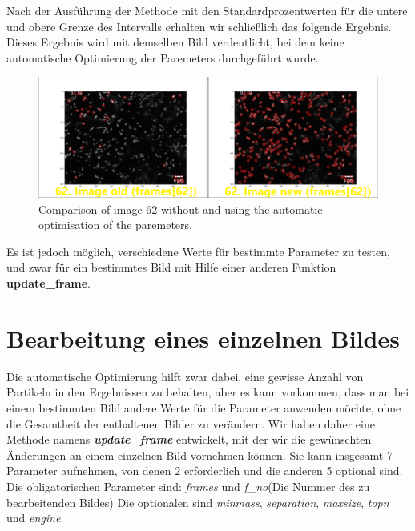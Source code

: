 Nach der Ausführung der Methode mit den Standardprozentwerten für die untere und obere Grenze des Intervalls erhalten wir schließlich das folgende Ergebnis. Dieses Ergebnis wird mit demselben Bild verdeutlicht, bei dem keine automatische Optimierung der Paremeters durchgeführt wurde.

\begin{figure}[H]
    \centering
    \includegraphics[scale=0.35]{Grafiken/trackpyBilder/comparison_62alt_Vs_62new.png}
    \caption{Comparison of image 62 without and using the automatic optimisation of the paremeters.}
\end{figure}
Es ist jedoch möglich, verschiedene Werte für bestimmte Parameter zu testen, und zwar für ein bestimmtes Bild mit Hilfe einer anderen Funktion \textbf{update\_frame}.

\section{Bearbeitung eines einzelnen Bildes}
Die automatische Optimierung hilft zwar dabei, eine gewisse Anzahl von Partikeln in den Ergebnissen zu behalten, aber es kann vorkommen, dass man bei einem bestimmten Bild andere Werte für die Parameter anwenden möchte, ohne die Gesamtheit der enthaltenen Bilder zu verändern. 
Wir haben daher eine Methode namens \textit{\textbf{update\_frame}} entwickelt, mit der wir die gewünschten Änderungen an einem einzelnen Bild vornehmen können.
Sie kann insgesamt 7 Parameter aufnehmen, von denen 2 erforderlich und die anderen 5 optional sind. Die obligatorischen Parameter sind: \textit{frames} und \textit{f\_no}(Die Nummer des zu bearbeitenden Bildes)
Die optionalen sind \textit{minmass}, \textit{separation}, \textit{maxsize}, \textit{topn} und \textit{engine}.

